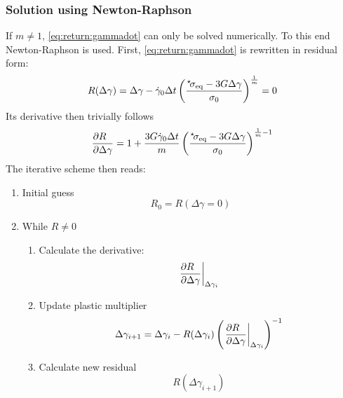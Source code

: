 \documentclass[times,namecite]{goose-article}
\newcommand\leftstar[1]{\hspace*{-.3em}~^\star\!#1}
\begin{document}
\subsubsection{Solution using Newton-Raphson}

If $m \neq 1$, \eqref{eq:return:gammadot} can only be solved numerically. To this end Newton-Raphson is used. First, \eqref{eq:return:gammadot} is rewritten in residual form:
\begin{equation}
  R ( \Delta \gamma )
  =
  \Delta \gamma - \dot{\gamma}_0 \Delta t
  \left(
    \frac{
      \leftstar{\sigma}_\mathrm{eq} - 3 G \Delta \gamma
    }{
      \sigma_0
    }
  \right)^{\frac{1}{m}}
  =
  0
\end{equation}
Its derivative then trivially follows
\begin{equation}
  \frac{\partial R \hfill}{\partial \Delta \gamma \hfill} =
  1 + \frac{ 3 G \dot{\gamma}_0 \Delta t }{m}
  \left(
    \frac{
      \leftstar{\sigma}_\mathrm{eq} - 3 G \Delta \gamma
    }{
      \sigma_0
    }
  \right)^{\frac{1}{m}-1}
\end{equation}
The iterative scheme then reads:

\begin{enumerate}
%
\item Initial guess
\begin{equation}
  R_0 = R ( \Delta \gamma = 0 )
\end{equation}
%
\item While \(R \neq 0\)
%
\begin{enumerate}
%
\item Calculate the derivative:
\begin{equation}
\left.
    \frac{\partial R \hfill}{\partial \Delta \gamma \hfill}
    \right|_{\Delta \gamma_i}
\end{equation}
%
\item Update plastic multiplier
\begin{equation}
  \Delta \gamma_{i+1} = \Delta \gamma_i -
  R(\Delta \gamma_i)
  \left( \left.
    \frac{\partial R \hfill}{\partial \Delta \gamma \hfill}
  \right|_{\Delta \gamma_i} \right)^{-1}
\end{equation}
%
\item Calculate new residual
\begin{equation}
  R( \Delta \gamma_{i+1} )
\end{equation}
%
\end{enumerate}
%
\end{enumerate}
\end{document}
